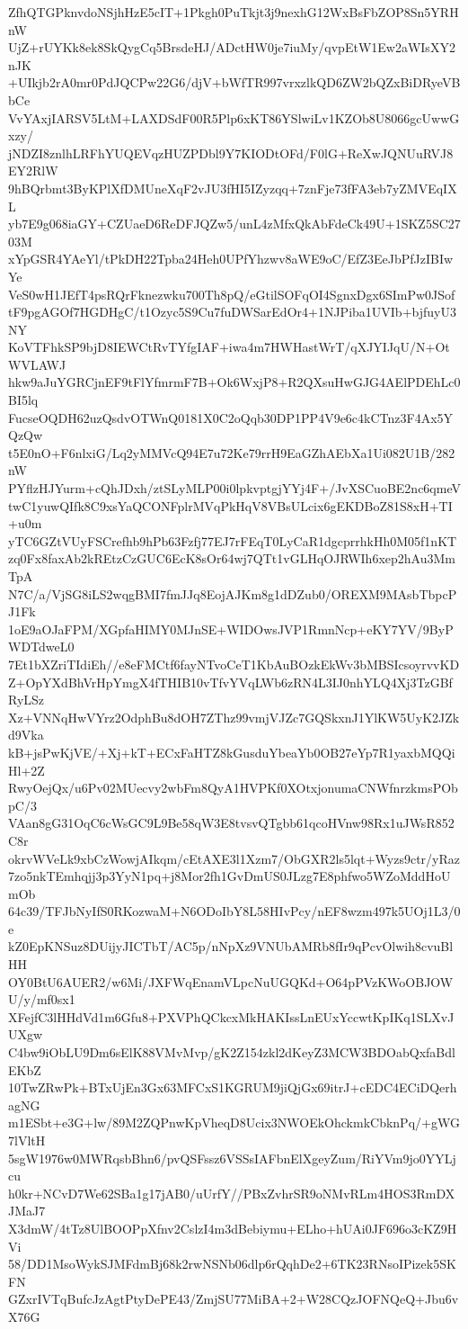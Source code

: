 ZfhQTGPknvdoNSjhHzE5cIT+1Pkgh0PuTkjt3j9nexhG12WxBsFbZOP8Sn5YRHnW
UjZ+rUYKk8ek8SkQygCq5BrsdeHJ/ADctHW0je7iuMy/qvpEtW1Ew2aWIsXY2nJK
+UIkjb2rA0mr0PdJQCPw22G6/djV+bWfTR997vrxzlkQD6ZW2bQZxBiDRyeVBbCe
VvYAxjIARSV5LtM+LAXDSdF00R5Plp6xKT86YSlwiLv1KZOb8U8066gcUwwGxzy/
jNDZI8znlhLRFhYUQEVqzHUZPDbl9Y7KIODtOFd/F0lG+ReXwJQNUuRVJ8EY2RlW
9hBQrbmt3ByKPlXfDMUneXqF2vJU3fHI5IZyzqq+7znFje73fFA3eb7yZMVEqIXL
yb7E9g068iaGY+CZUaeD6ReDFJQZw5/unL4zMfxQkAbFdeCk49U+1SKZ5SC2703M
xYpGSR4YAeYl/tPkDH22Tpba24Heh0UPfYhzwv8aWE9oC/EfZ3EeJbPfJzIBIwYe
VeS0wH1JEfT4psRQrFknezwku700Th8pQ/eGtilSOFqOI4SgnxDgx6SImPw0JSof
tF9pgAGOf7HGDHgC/t1Ozyc5S9Cu7fuDWSarEdOr4+1NJPiba1UVIb+bjfuyU3NY
KoVTFhkSP9bjD8IEWCtRvTYfgIAF+iwa4m7HWHastWrT/qXJYIJqU/N+OtWVLAWJ
hkw9aJuYGRCjnEF9tFlYfmrmF7B+Ok6WxjP8+R2QXsuHwGJG4AElPDEhLc0BI5lq
FucseOQDH62uzQsdvOTWnQ0181X0C2oQqb30DP1PP4V9e6c4kCTnz3F4Ax5YQzQw
t5E0nO+F6nlxiG/Lq2yMMVcQ94E7u72Ke79rrH9EaGZhAEbXa1Ui082U1B/282nW
PYflzHJYurm+cQhJDxh/ztSLyMLP00i0lpkvptgjYYj4F+/JvXSCuoBE2nc6qmeV
twC1yuwQIfk8C9xsYaQCONFplrMVqPkHqV8VBsULcix6gEKDBoZ81S8xH+TI+u0m
yTC6GZtVUyFSCrefhb9hPb63Fzfj77EJ7rFEqT0LyCaR1dgcprrhkHh0M05f1nKT
zq0Fx8faxAb2kREtzCzGUC6EcK8sOr64wj7QTt1vGLHqOJRWIh6xep2hAu3MmTpA
N7C/a/VjSG8iLS2wqgBMI7fmJJq8EojAJKm8g1dDZub0/OREXM9MAsbTbpcPJ1Fk
1oE9aOJaFPM/XGpfaHIMY0MJnSE+WIDOwsJVP1RmnNcp+eKY7YV/9ByPWDTdweL0
7Et1bXZriTIdiEh//e8eFMCtf6fayNTvoCeT1KbAuBOzkEkWv3bMBSIcsoyrvvKD
Z+OpYXdBhVrHpYmgX4fTHIB10vTfvYVqLWb6zRN4L3IJ0nhYLQ4Xj3TzGBfRyLSz
Xz+VNNqHwVYrz2OdphBu8dOH7ZThz99vmjVJZc7GQSkxnJ1YlKW5UyK2JZkd9Vka
kB+jsPwKjVE/+Xj+kT+ECxFaHTZ8kGusduYbeaYb0OB27eYp7R1yaxbMQQiHl+2Z
RwyOejQx/u6Pv02MUecvy2wbFm8QyA1HVPKf0XOtxjonumaCNWfnrzkmsPObpC/3
VAan8gG31OqC6cWsGC9L9Be58qW3E8tvsvQTgbb61qcoHVnw98Rx1uJWsR852C8r
okrvWVeLk9xbCzWowjAIkqm/cEtAXE3l1Xzm7/ObGXR2ls5lqt+Wyzs9ctr/yRaz
7zo5nkTEmhqjj3p3YyN1pq+j8Mor2fh1GvDmUS0JLzg7E8phfwo5WZoMddHoUmOb
64c39/TFJbNyIfS0RKozwaM+N6ODoIbY8L58HIvPcy/nEF8wzm497k5UOj1L3/0e
kZ0EpKNSuz8DUijyJICTbT/AC5p/nNpXz9VNUbAMRb8fIr9qPcvOlwih8cvuBlHH
OY0BtU6AUER2/w6Mi/JXFWqEnamVLpcNuUGQKd+O64pPVzKWoOBJOWU/y/mf0sx1
XFejfC3lHHdVd1m6Gfu8+PXVPhQCkcxMkHAKIssLnEUxYccwtKpIKq1SLXvJUXgw
C4bw9iObLU9Dm6sElK88VMvMvp/gK2Z154zkl2dKeyZ3MCW3BDOabQxfaBdlEKbZ
10TwZRwPk+BTxUjEn3Gx63MFCxS1KGRUM9jiQjGx69itrJ+cEDC4ECiDQerhagNG
m1ESbt+e3G+lw/89M2ZQPnwKpVheqD8Ucix3NWOEkOhckmkCbknPq/+gWG7lVltH
5sgW1976w0MWRqsbBhn6/pvQSFssz6VSSsIAFbnElXgeyZum/RiYVm9jo0YYLjcu
h0kr+NCvD7We62SBa1g17jAB0/uUrfY//PBxZvhrSR9oNMvRLm4HOS3RmDXJMaJ7
X3dmW/4tTz8UlBOOPpXfnv2CslzI4m3dBebiymu+ELho+hUAi0JF696o3cKZ9HVi
58/DD1MsoWykSJMFdmBj68k2rwNSNb06dlp6rQqhDe2+6TK23RNsoIPizek5SKFN
GZxrIVTqBufcJzAgtPtyDePE43/ZmjSU77MiBA+2+W28CQzJOFNQeQ+Jbu6vX76G
